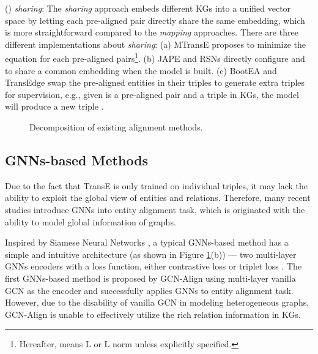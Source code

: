 \documentclass[sigconf,camera-ready]{acmart}
\begin{document}
() \emph{sharing}:
The \emph{sharing} approach embeds different KGs into a unified vector space by letting each pre-aligned pair directly share the same embedding, which is more straightforward compared to the \emph{mapping} approaches.
There are three different implementations about \emph{sharing}:
(a) MTransE \cite{DBLP:conf/ijcai/ChenTYZ17} proposes to minimize the equation  for each pre-aligned pairs\footnote{Hereafter,  means L or L norm unless explicitly specified.}.
(b) JAPE \cite{DBLP:conf/semweb/SunHL17} and RSNs \cite{DBLP:conf/icml/GuoSH19} directly configure  and  to share a common embedding when the model is built.
(c) BootEA \cite{DBLP:conf/ijcai/SunHZQ18} and TransEdge \cite{DBLP:conf/semweb/SunHHCGQ19} swap the pre-aligned entities in their triples to generate extra triples for supervision,
e.g., given  is a pre-aligned pair and a triple  in KGs, the model will produce a new triple .

\begin{figure}
  \caption{Decomposition of existing alignment methods.}\label{figure:rw}
\end{figure}

\subsection{GNNs-based Methods}
Due to the fact that TransE is only trained on individual triples, it may lack the ability to exploit the global view of entities and relations.
Therefore, many recent studies introduce GNNs into entity alignment task, which is originated with the ability to model global information of graphs.

Inspired by Siamese Neural Networks \cite{DBLP:conf/cvpr/ChopraHL05}, a typical GNNs-based method has a simple and intuitive architecture (as shown in Figure \ref{figure:rw}(b)) --- two multi-layer GNNs encoders with a loss function, either contrastive loss \cite{DBLP:conf/cvpr/HadsellCL06} or triplet loss \cite{DBLP:conf/cvpr/SchroffKP15}.
The first GNNs-based method is proposed by GCN-Align \cite{DBLP:conf/emnlp/WangLLZ18} using multi-layer vanilla GCN as the encoder and successfully applies GNNs to entity alignment task.
However, due to the disability of vanilla GCN in modeling heterogeneous graphs, GCN-Align is unable to effectively utilize the rich relation information in KGs.
\end{document}
